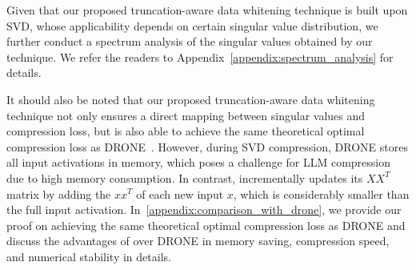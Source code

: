 %
Given that our proposed truncation-aware data whitening technique is built upon SVD, whose applicability depends on certain singular value distribution, we further conduct a spectrum analysis of the singular values obtained by our technique. We refer the readers to Appendix~\ref{appendix:spectrum_analysis} for details.

%
It should also be noted that our proposed truncation-aware data whitening technique not only ensures a direct mapping between singular values and compression loss, but is also able to achieve the same theoretical optimal compression loss as DRONE~\citep{DBLP:conf/nips/ChenYDH21}.
%
%
However, during SVD compression, DRONE stores all input activations in memory, which poses a challenge for LLM compression due to high memory consumption.
%
In contrast, \sysname incrementally updates its $XX^T$ matrix by adding the $xx^T$ of each new input $x$,  which is considerably smaller than the full input activation.
%
In~\cref{appendix:comparison_with_drone}, we provide our proof on \sysname achieving the same theoretical optimal compression loss as DRONE and discuss the advantages of \sysname over DRONE in memory saving, compression speed, and numerical stability in details.



